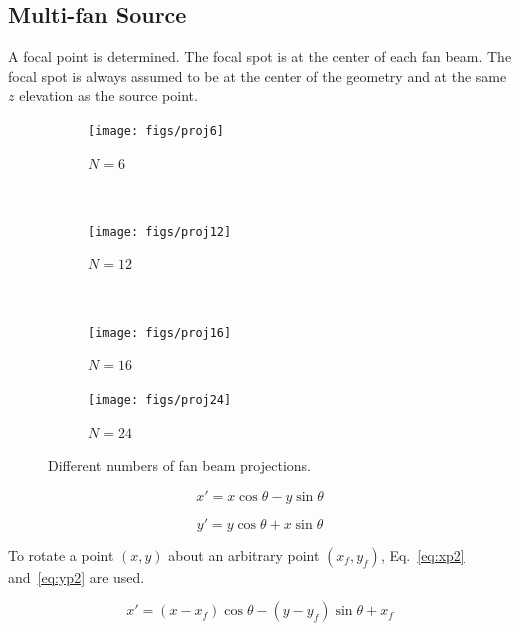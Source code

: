 \subsection{Multi-fan Source}
A focal point is determined. The focal spot is at the center of each fan beam. The focal spot is always assumed to be at the center of the geometry and at the same $z$ elevation as the source point.

\begin{figure}
    \centering
    \begin{subfigure}[b]{0.2\textwidth}
        \texttt{[image: figs/proj6]}
        \caption{$N=6$}
        \label{fig:proj6}
    \end{subfigure}
    ~ %
    \begin{subfigure}[b]{0.2\textwidth}
        \texttt{[image: figs/proj12]}
        \caption{$N=12$}
        \label{fig:proj12}
    \end{subfigure}
    ~ %
    \begin{subfigure}[b]{0.2\textwidth}
        \texttt{[image: figs/proj16]}
        \caption{$N=16$}
        \label{fig:proj16}
    \end{subfigure}
    \begin{subfigure}[b]{0.2\textwidth}
        \texttt{[image: figs/proj24]}
        \caption{$N=24$}
        \label{fig:proj24}
    \end{subfigure}
    \caption{Different numbers of fan beam projections.}\label{fig:fanproj}
\end{figure}

\begin{equation}\label{eq:xp}
x' = x \cos \theta - y \sin \theta
\end{equation}

\begin{equation}\label{eq:yp}
y' = y \cos \theta + x \sin \theta
\end{equation}

To rotate a point $(x,y)$ about an arbitrary point $(x_f, y_f)$, Eq.~\ref{eq:xp2} and~\ref{eq:yp2} are used.

\begin{equation}\label{eq:xp2}
x' = (x-x_f) \cos \theta - (y-y_f) \sin \theta + x_f
\end{equation}

